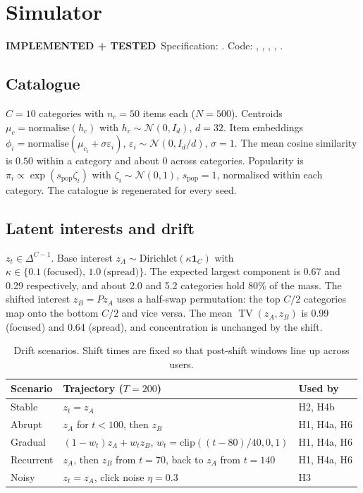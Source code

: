 \documentclass[11pt,a4paper]{article}
\newcommand{\statustag}[2]{\colorbox{#1}{\scriptsize\sffamily\bfseries #2}}
\newcommand{\implemented}{\statustag{blue!12}{IMPLEMENTED + TESTED}}
\newcommand{\TV}{\operatorname{TV}}
\begin{document}
\section{Simulator}\label{sec:sim}
\implemented\ Specification: . Code: ,
, , , .

\subsection{Catalogue}
$C=10$ categories with $n_c=50$ items each ($N=500$). Centroids $\mu_c=\mathrm{normalise}(h_c)$
with $h_c\sim\mathcal N(0,I_d)$, $d=32$. Item embeddings
$\phi_i=\mathrm{normalise}(\mu_{c_i}+\sigma\varepsilon_i)$, $\varepsilon_i\sim\mathcal N(0,I_d/d)$,
$\sigma=1$. The mean cosine similarity is $0.50$ within a category and about $0$ across
categories. Popularity is $\pi_i\propto\exp(s_{\mathrm{pop}}\zeta_i)$ with $\zeta_i\sim\mathcal N(0,1)$,
$s_{\mathrm{pop}}=1$, normalised within each category. The catalogue is regenerated for every
seed.

\subsection{Latent interests and drift}
$z_t\in\Delta^{C-1}$. Base interest $z_A\sim\mathrm{Dirichlet}(\kappa\mathbf 1_C)$ with
$\kappa\in\{0.1\ \text{(focused)},\,1.0\ \text{(spread)}\}$. The expected largest component is
0.67 and 0.29 respectively, and about 2.0 and 5.2 categories hold 80\% of the mass. The shifted
interest $z_B=Pz_A$ uses a half-swap permutation: the top $C/2$ categories map onto the bottom
$C/2$ and vice versa. The mean $\TV(z_A,z_B)$ is 0.99 (focused) and 0.64 (spread), and
concentration is unchanged by the shift.

\begin{table}[h]\centering\small
\begin{tabular}{lll}
\toprule
Scenario & Trajectory ($T=200$) & Used by \\
\midrule
Stable    & $z_t=z_A$ & H2, H4b \\
Abrupt    & $z_A$ for $t<100$, then $z_B$ & H1, H4a, H6 \\
Gradual   & $(1-w_t)z_A+w_tz_B$, $w_t=\mathrm{clip}((t-80)/40,0,1)$ & H1, H4a, H6 \\
Recurrent & $z_A$, then $z_B$ from $t=70$, back to $z_A$ from $t=140$ & H1, H4a, H6 \\
Noisy     & $z_t=z_A$, click noise $\eta=0.3$ & H3 \\
\bottomrule
\end{tabular}
\caption{Drift scenarios. Shift times are fixed so that post-shift windows line up across users.}
\end{table}
\end{document}
